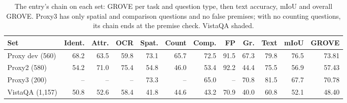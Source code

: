 \documentclass{article}
\newcommand{\ours}{\rowcolor{oursbg}}
\begin{document}
\begin{table}[!htbp]
\centering\scriptsize
\caption{The entry's chain on each set: GROVE per task and question type, then text accuracy, mIoU and overall GROVE. Proxy3 has
only spatial and comparison questions and no false premises; with no counting questions, its chain ends at the premise check.
VistaQA shaded.}
\label{tab:across}
\begin{tabular}{lrrrrrrrrrrr}
\toprule
Set & Ident. & Attr. & OCR & Spat. & Count & Comp. & FP & Gr. & Text & mIoU & GROVE \\
\midrule
Proxy dev (560) & 68.2 & 63.5 & 59.8 & 73.1 & 65.7 & 72.5 & 91.5 & 67.3 & 79.8 & 76.5 & 73.81 \\
Proxy2 (580) & 54.2 & 71.0 & 75.4 & 54.8 & 46.0 & 53.4 & 92.2 & 44.4 & 75.5 & 56.9 & 57.43 \\
Proxy3 (200) & -- & -- & -- & 73.3 & -- & 65.0 & -- & 70.8 & 81.5 & 67.7 & 70.78 \\
\midrule
\ours VistaQA (1,157) & 50.8 & 52.6 & 58.4 & 41.8 & 44.6 & 43.2 & 70.9 & 40.0 & 60.8 & 52.1 & 48.40 \\
\bottomrule
\end{tabular}
\end{table}
\end{document}
